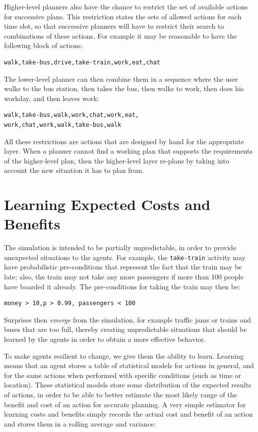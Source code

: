 Higher-level planners also have the chance to restrict the set of available actions for successive plans. This restriction states the sets of allowed actions for each time slot, so that successive planners will have to restrict their search to combinations of these actions. For example it may be reasonable to have the following block of actions:

\begin{lstlisting}
walk,take-bus,drive,take-train,work,eat,chat
\end{lstlisting}

The lower-level planner can then combine them in a sequence where the user walks to the bus station, then takes the bus, then walks to work, then does his workday, and then leaves work:

\begin{lstlisting}
walk,take-bus,walk,work,chat,work,eat,
work,chat,work,walk,take-bus,walk
\end{lstlisting}

All these restrictions are actions that are designed by hand for the appropriate layer. When a planner cannot find a working plan that supports the requirements of the higher-level plan, then the higher-level layer re-plans by taking into account the new situation it has to plan from.


\section{Learning Expected Costs and Benefits}
\label{sec:learning}

The simulation is intended to be partially unpredictable, in order to provide unexpected situations to the agents. For example, the \texttt{take-train} activity may have probabilistic pre-conditions that represent the fact that the train may be late; also, the train may not take any more passengers if more than 100 people have boarded it already. The pre-conditions for taking the train may then be:

\begin{lstlisting}
money > 10,p > 0.99, passengers < 100
\end{lstlisting}

Surprises then \textit{emerge} from the simulation, for example traffic jams or trains and buses that are too full, thereby creating unpredictable situations that should be learned by the agents in order to obtain a more effective behavior.

To make agents resilient to change, we give them the ability to learn. Learning means that an agent stores a table of statistical models for actions in general, and for the same actions when performed with specific conditions (such as time or location). These statistical models store some distribution of the expected results of actions, in order to be able to better estimate the most likely range of the benefit and cost of an action for accurate planning. A very simple estimator for learning costs and benefits simply records the actual cost and benefit of an action and stores them in a rolling average and variance:


